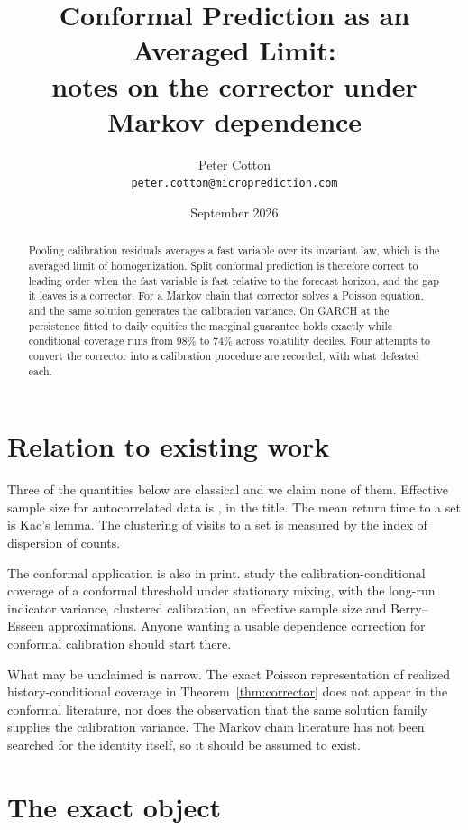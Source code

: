 \documentclass[11pt]{article}
\title{Conformal Prediction as an Averaged Limit:\\
notes on the corrector under Markov dependence}
\author{Peter Cotton\\\texttt{peter.cotton@microprediction.com}}
\date{September 2026}
\theoremstyle{definition}
\theoremstyle{remark}
\begin{document}
\maketitle

\begin{abstract}
Pooling calibration residuals averages a fast variable over its invariant law, which is the
averaged limit of homogenization. Split conformal prediction is therefore correct to leading order
when the fast variable is fast relative to the forecast horizon, and the gap it leaves is a
corrector. For a Markov chain that corrector solves a Poisson equation, and the same solution
generates the calibration variance. On GARCH at the persistence fitted to daily equities the
marginal guarantee holds exactly while conditional coverage runs from 98\% to 74\% across
volatility deciles. Four attempts to convert the corrector into a calibration procedure are
recorded, with what defeated each.
\end{abstract}

\section{Relation to existing work}\label{sec:status}

Three of the quantities below are classical and we claim none of them. Effective sample size for
autocorrelated data is \citet{bayley1946effective}, in the title. The mean return time to a set is
Kac's lemma. The clustering of visits to a set is measured by the index of dispersion of counts.

The conformal application is also in print. \citet{ramos2024transported} study the
calibration-conditional coverage of a conformal threshold under stationary mixing, with the
long-run indicator variance, clustered calibration, an effective sample size and Berry--Esseen
approximations. Anyone wanting a usable dependence correction for conformal calibration should
start there.

What may be unclaimed is narrow. The exact Poisson representation of realized history-conditional
coverage in Theorem~\ref{thm:corrector} does not appear in the conformal literature, nor does the
observation that the same solution family supplies the calibration variance. The Markov chain
literature has not been searched for the identity itself, so it should be assumed to exist.

\section{The exact object}
\end{document}
